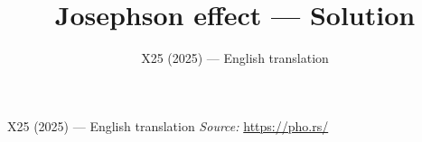 \documentclass[11pt,a4paper]{article}
\title{\textbf{Josephson effect --- Solution}}
\author{\normalsize X25 (2025) — English translation}
\date{}
\begin{document}
\maketitle
X25 (2025) — English translation
\vspace{1em}
\noindent\textit{Source:} \url{https://pho.rs/}
\end{document}
